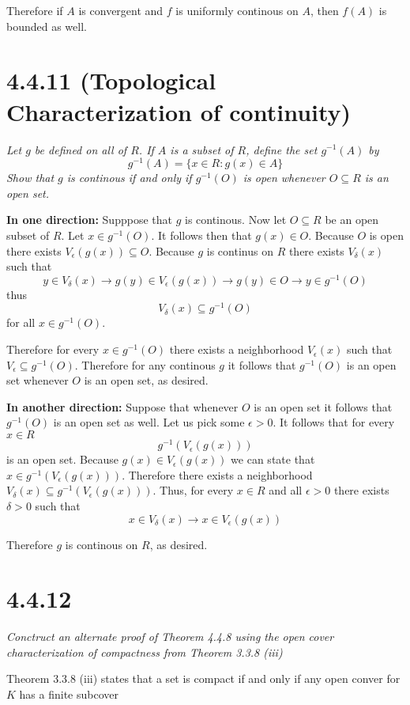 \documentclass[11pt,oneside,titlepage]{book}
\begin{document}
Therefore if $A$ is convergent and $f$ is uniformly continous on $A$, then
$f(A)$ is bounded as well.

\section*{4.4.11 (Topological Characterization of continuity)}
\textit{Let $g$ be defined on all of $R$. If $A$ is a subset of $R$, define the
  set $g^{-1}(A)$ by }
$$g^{-1}(A) = \{x \in R: g(x) \in A\}$$
\textit{Show that $g$ is continous if and only if $g^{-1}(O)$ is open whenever
  $O \subseteq R$ is an open set.}

\textbf{In one direction: }
Supppose that $g$ is continous. Now let $O \subseteq R$ be an open subset of
$R$. Let $x \in g^{-1}(O)$. It follows then that $g(x) \in O$. Because
$O$ is open there exists $V_\epsilon(g(x)) \subseteq O$. Because $g$ is
continus on $R$ there exists $V_\delta(x)$ such that
$$y \in V_\delta(x) \to g(y) \in V_\epsilon(g(x)) \to
g(y) \in O \to y \in g^{-1}(O)$$
thus
$$V_\delta(x) \subseteq  g^{-1}(O)$$
for all $x \in g^{-1}(O)$.

Therefore for every $x \in g^{-1}(O)$ there exists a neighborhood
$V_\epsilon(x)$ such that $V_\epsilon \subseteq g^{-1}(O)$. Therefore
for any continous $g$ it follows that $g^{-1}(O)$ is an open set  whenever
$O$ is an open set, as desired.

\textbf{In another direction: }
Suppose that whenever $O$ is an open set it follows that $g^{-1}(O)$ is an
open set as well. Let us pick some $\epsilon > 0$. It follows that for
every $x \in R$
$$g^{-1}(V_\epsilon(g(x)))$$
is an open set. Because $g(x) \in V_\epsilon(g(x))$ we can state that
$x \in g^{-1}(V_\epsilon(g(x)))$. Therefore there exists a neighborhood
$V_\delta(x) \subseteq g^{-1}(V_\epsilon(g(x)))$. Thus, for every $x \in R$ and
all $\epsilon > 0$ there exists $\delta > 0$ such that
$$x \in V_\delta(x) \to x \in V_\epsilon(g(x))$$

Therefore $g$ is continous on $R$, as desired.

\section*{4.4.12}
\textit{Conctruct an alternate proof of Theorem 4.4.8 using the open cover
  characterization of compactness from Theorem 3.3.8 (iii)}

Theorem 3.3.8 (iii) states that a set is compact if and only if any open conver
for $K$ has a finite subcover
\end{document}
